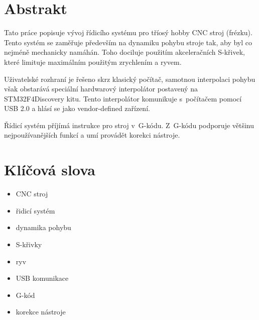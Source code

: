 
\renewcommand{\labelitemi}{--}

\section*{Abstrakt}\label{AbstraktCZ}

\begin{spacing}{1.3}
	Tato práce popisuje vývoj řídicího systému pro tříosý hobby CNC stroj (frézku). Tento systém se zaměřuje především na dynamiku pohybu stroje tak, aby byl co nejméně mechanicky namáhán. Toho dociluje použitím akceleračních S-křivek, které limituje maximálním použitým zrychlením a ryvem.
	
	Uživatelské rozhraní je řešeno skrz klasický počítač, samotnou interpolaci pohybu však obstarává speciální hardwarový interpolátor postavený na STM32F4Discovery kitu. Tento interpolátor komunikuje s~počítačem pomocí USB 2.0 a hlásí se jako vendor-defined zařízení.
	
	Řídicí systém příjímá instrukce pro stroj v~G-kódu. Z~G-kódu podporuje většinu nejpoužívanějších funkcí a umí provádět korekci nástroje.
\end{spacing}

\section*{Klíčová slova}

\begin{itemize}
	\item CNC stroj
	\item řidicí systém
	\item dynamika pohybu
	\item S-křivky
	\item ryv
	\item USB komunikace
	\item G-kód
	\item korekce nástroje
\end{itemize}

\newpage

